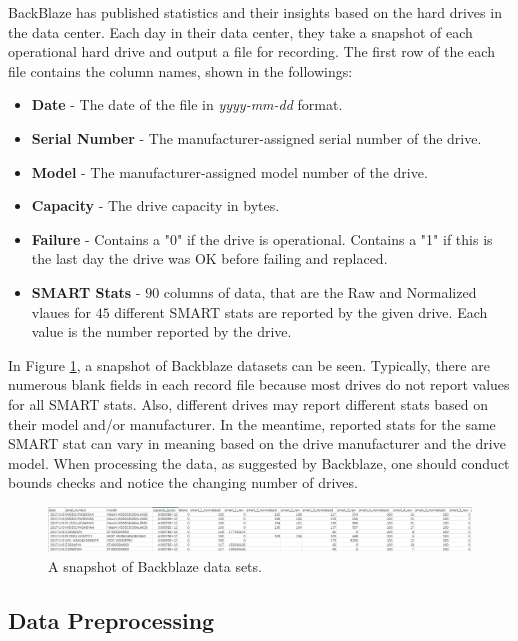 \documentclass[12pt,a4paper,english]{amsart}
\begin{document}
BackBlaze has published statistics and their insights based on the hard drives in the data center.
Each day in their data center, they take a snapshot of each operational hard drive and output a file for recording.
The first row of the each file contains the column names, shown in the followings:
\begin{itemize}
	\item \textbf{Date} - The date of the file in \textit{yyyy-mm-dd} format.
	\item \textbf{Serial Number} - The manufacturer-assigned serial number of the drive.
	\item \textbf{Model} - The manufacturer-assigned model number of the drive.
	\item \textbf{Capacity} - The drive capacity in bytes.
	\item \textbf{Failure} - Contains a "0"  if the drive is operational. Contains a "1" if this is the last day the drive was OK before failing and replaced.
	\item \textbf{SMART Stats} - $90$ columns of data, that are the Raw and Normalized vlaues for $45$ different SMART stats are reported by the given drive. Each value is the number reported by the drive.
\end{itemize}

In Figure \ref{fig:snapshot}, a snapshot of Backblaze datasets can be seen. Typically, there are numerous blank fields in each record file because most drives do not report values for all SMART stats.
Also, different drives may report different stats based on their model and/or manufacturer. In the meantime, reported stats for the same SMART stat can vary in meaning based on the drive manufacturer and the drive model.
When processing the data, as suggested by Backblaze, one should conduct bounds checks and notice the changing number of drives.

\begin{figure}[htb]
	\centering
	\includegraphics[width=\textwidth]{img/snapshot_data_wide.PNG}
	\caption{A snapshot of Backblaze data sets.}\label{fig:snapshot}
\end{figure}

\subsection{Data Preprocessing}
\end{document}
